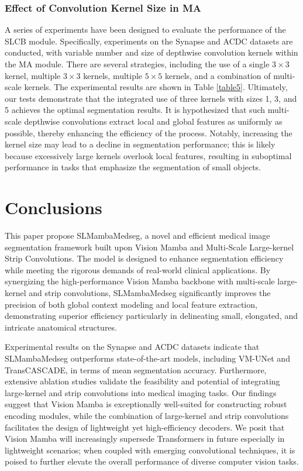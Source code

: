 \documentclass[letterpaper, 10 pt, conference]{ieeeconf}  %
\begin{document}
\subsubsection{Effect of Convolution Kernel Size in MA}

A series of experiments have been designed to evaluate the performance of the SLCB module. Specifically, experiments on the Synapse and ACDC datasets are conducted, with variable number and size of depthwise convolution kernels within the MA module. There are several strategies, including the use of a single $3 \times 3$ kernel, multiple $3 \times 3$ kernels, multiple $5 \times 5$ kernels, and a combination of multi-scale kernels. The experimental results are shown in Table \textcolor{red}{\ref{table5}}. Ultimately, our tests demonstrate that the integrated use of three kernels with sizes 1, 3, and 5 achieves the optimal segmentation results. It is hypothesized that such multi-scale depthwise convolutions extract local and global features as uniformly as possible, thereby enhancing the efficiency of the process. Notably, increasing the kernel size may lead to a decline in segmentation performance; this is likely because excessively large kernels overlook local features, resulting in suboptimal performance in tasks that emphasize the segmentation of small objects.






\section{Conclusions}

This paper propose SLMambaMedseg, a novel and efficient medical image segmentation framework built upon Vision Mamba and Multi-Scale Large-kernel Strip Convolutions. The model is designed to enhance segmentation efficiency while meeting the rigorous demands of real-world clinical applications. By synergizing the high-performance Vision Mamba backbone with multi-scale large-kernel and strip convolutions, SLMambaMedseg significantly improves the precision of both global context modeling and local feature extraction, demonstrating superior efficiency particularly in delineating small, elongated, and intricate anatomical structures.

Experimental results on the Synapse and ACDC datasets indicate that SLMambaMedseg outperforms state-of-the-art models, including VM-UNet and TransCASCADE, in terms of mean segmentation accuracy. Furthermore, extensive ablation studies validate the feasibility and potential of integrating large-kernel and strip convolutions into medical imaging tasks. Our findings suggest that Vision Mamba is exceptionally well-suited for constructing robust encoding modules, while the combination of large-kernel and strip convolutions facilitates the design of lightweight yet high-efficiency decoders. We posit that Vision Mamba will increasingly supersede Transformers in future especially in lightweight scenarios; when coupled with emerging convolutional techniques, it is poised to further elevate the overall performance of diverse computer vision tasks.
\end{document}
